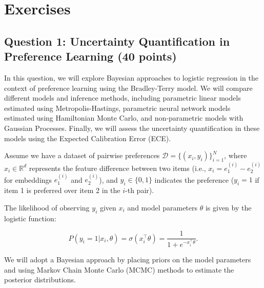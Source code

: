 \documentclass[
  letterpaper,
  numbers=noenddot,
  DIV=11]{scrreprt}
\theoremstyle{plain}
\theoremstyle{definition}
\theoremstyle{remark}
\begin{document}
\section{Exercises}\label{exercises-1}

\subsection*{Question 1: Uncertainty Quantification in Preference
Learning (40
points)}\label{sec-question-1-uncertainty-quantification-in-preference-learning-40-points}

In this question, we will explore Bayesian approaches to logistic
regression in the context of preference learning using the Bradley-Terry
model. We will compare different models and inference methods, including
parametric linear models estimated using Metropolis-Hastings, parametric
neural network models estimated using Hamiltonian Monte Carlo, and
non-parametric models with Gaussian Processes. Finally, we will assess
the uncertainty quantification in these models using the Expected
Calibration Error (ECE).

Assume we have a dataset of pairwise preferences
\(\mathcal{D} = \{(x_i, y_i)\}_{i=1}^N\), where \(x_i \in \mathbb{R}^d\)
represents the feature difference between two items (i.e.,
\(x_i = e^{(i)}_1 - e^{(i)}_2\) for embeddings \(e^{(i)}_1\) and
\(e^{(i)}_2\)), and \(y_i \in \{0, 1\}\) indicates the preference
(\(y_i = 1\) if item 1 is preferred over item 2 in the \(i\)-th pair).

The likelihood of observing \(y_i\) given \(x_i\) and model parameters
\(\theta\) is given by the logistic function:

\[P(y_i = 1 | x_i, \theta) = \sigma(x_i^\top \theta) = \frac{1}{1 + e^{-x_i^\top \theta}}.\]

We will adopt a Bayesian approach by placing priors on the model
parameters and using Markov Chain Monte Carlo (MCMC) methods to estimate
the posterior distributions.
\end{document}
